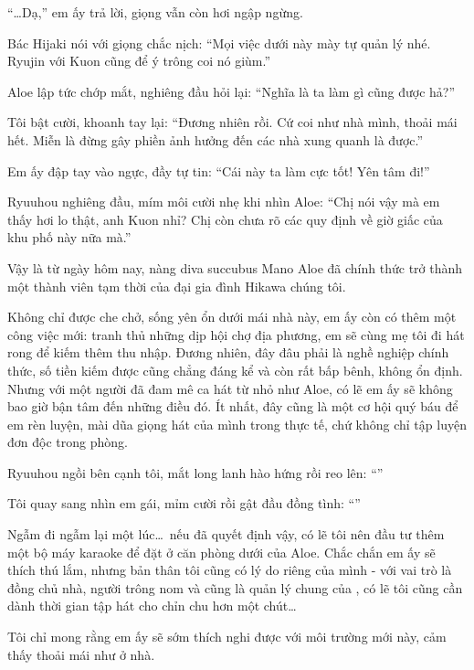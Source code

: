 \documentclass[../main.tex]{subfiles}
\begin{document}
``\dots Dạ,'' em ấy trả lời, giọng vẫn còn hơi ngập ngừng.

Bác Hijaki nói với giọng chắc nịch: ``Mọi việc dưới này mày tự quản lý nhé. Ryujin với Kuon cũng để ý trông coi nó giùm.''

Aloe lập tức chớp mắt, nghiêng đầu hỏi lại: ``Nghĩa là ta làm gì cũng được hả?''

Tôi bật cười, khoanh tay lại: ``Đương nhiên rồi. Cứ coi như nhà mình, thoải mái hết. Miễn là đừng gây phiền ảnh hưởng đến các nhà xung quanh là được.''

Em ấy đập tay vào ngực, đầy tự tin: ``Cái này ta làm cực tốt! Yên tâm đi!''

Ryuuhou nghiêng đầu, mím môi cười nhẹ khi nhìn Aloe: ``Chị nói vậy mà em thấy hơi lo thật, anh Kuon nhỉ? Chị còn chưa rõ các quy định về giờ giấc của khu phố này nữa mà.''

\il

Vậy là từ ngày hôm nay, nàng diva succubus Mano Aloe đã chính thức trở thành một thành viên tạm thời của đại gia đình Hikawa chúng tôi.

Không chỉ được che chở, sống yên ổn dưới mái nhà này, em ấy còn có thêm một công việc mới: tranh thủ những dịp hội chợ địa phương, em sẽ cùng mẹ tôi đi hát rong để kiếm thêm thu nhập. Đương nhiên, đây đâu phải là nghề nghiệp chính thức, số tiền kiếm được cũng chẳng đáng kể và còn rất bấp bênh, không ổn định. Nhưng với một người đã đam mê ca hát từ nhỏ như Aloe, có lẽ em ấy sẽ không bao giờ bận tâm đến những điều đó. Ít nhất, đây cũng là một cơ hội quý báu để em rèn luyện, mài dũa giọng hát của mình trong thực tế, chứ không chỉ tập luyện đơn độc trong phòng.

Ryuuhou ngồi bên cạnh tôi, mắt long lanh hào hứng rồi reo lên: ``''

Tôi quay sang nhìn em gái, mỉm cười rồi gật đầu đồng tình: ``''

Ngẫm đi ngẫm lại một lúc\dots\ nếu đã quyết định vậy, có lẽ tôi nên đầu tư thêm một bộ máy karaoke để đặt ở căn phòng dưới của Aloe. Chắc chắn em ấy sẽ thích thú lắm, nhưng bản thân tôi cũng có lý do riêng của mình - với vai trò là đồng chủ nhà, người trông nom và cũng là quản lý chung của \hll, có lẽ tôi cũng cần dành thời gian tập hát cho chỉn chu hơn một chút\dots

Tôi chỉ mong rằng em ấy sẽ sớm thích nghi được với môi trường mới này, cảm thấy thoải mái như ở nhà.
\end{document}
